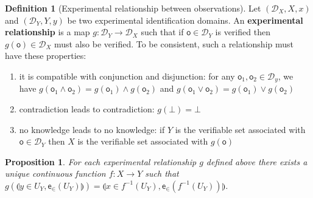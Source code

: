 \documentclass{amsart}
\newtheorem{prop}[thm]{Proposition}
\theoremstyle{definition}
\newtheorem{defn}[thm]{Definition}
\numberwithin{equation}{section}
\begin{document}
\begin{defn}[Experimental relationship between observations]
	Let $(\mathcal{D}_X, X, x)$ and $(\mathcal{D}_Y, Y, y)$ be two experimental identification domains. An \textbf{experimental relationship} is a map $g : \mathcal{D}_Y \rightarrow \mathcal{D}_X$ such that if $\mathsf{o} \in \mathcal{D}_Y$ is verified then $g(\mathsf{o}) \in \mathcal{D}_X$ must also be verified. To be consistent, such a relationship must have these properties:
	\begin{enumerate}
	\item it is compatible with conjunction and disjunction: for any $\mathsf{o}_1, \mathsf{o}_2 \in \mathcal{D}_y$, we have $g(\mathsf{o}_1 \wedge \mathsf{o}_2)=g(\mathsf{o}_1)\wedge g(\mathsf{o}_2)$ and $g(\mathsf{o}_1 \vee \mathsf{o}_2)=g(\mathsf{o}_1)\vee g(\mathsf{o}_2)$
	\item contradiction leads to contradiction: $g(\bot) = \bot$
	\item no knowledge leads to no knowledge: if $Y$ is the verifiable set associated with $\mathsf{o} \in \mathcal{D}_Y$ then $X$ is the verifiable set associated with  $g(\mathsf{o})$
	\end{enumerate}
\end{defn}

\begin{prop}
	For each experimental relationship $g$ defined above there exists a unique continuous function $f: X \rightarrow Y$ such that $g(\llparenthesis y\in U_Y,\mathsf{e}_{\in}(U_Y)\rrparenthesis) = \llparenthesis x\in f^{-1}(U_Y),\mathsf{e}_{\in}(f^{-1}(U_Y))\rrparenthesis$.
\end{prop}
\end{document}
